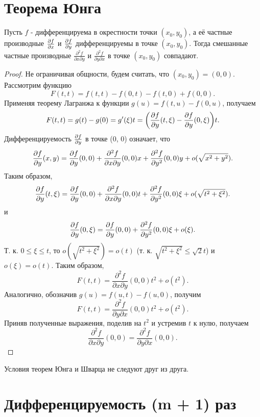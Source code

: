     \section{Теорема Юнга}
    
    \begin{theorem}[Юнг]
    	Пусть $f$ - дифференцируема в окрестности точки $(x_0, y_0)$, а её частные производные $\pdv{f}{x}$ и $\pdv{f}{y}$ дифференцируемы в точке $(x_0, y_0)$. Тогда смешанные частные производные $\frac{\partial^2 f}{\partial x \partial y}$ и $\frac{\partial^2 f}{\partial y \partial x}$ в точке $(x_0, y_0)$ совпадают.
    \end{theorem}
    
    \begin{proof}
    	Не ограничивая общности, будем считать, что $(x_0, y_0) = (0, 0)$. Рассмотрим функцию
    	\[ F(t, t) = f(t, t) - f(0, t) - f(t, 0) + f(0, 0). \]
    	Применяя теорему Лагранжа к функции $g(u) = f(t, u) - f(0, u)$, получаем
    	\[ F(t, t) = g(t) - g(0) = g'(\xi)t = \bigg(\frac{\partial f}{\partial y}(t, \xi) - \frac{\partial f}{\partial y}(0, \xi)\bigg)t. \]
    	Дифференцируемость $\frac{\partial f}{\partial y}$ в точке (0, 0) означает, что
    	\[ \frac{\partial f}{\partial y}(x, y) = \frac{\partial f}{\partial y}(0, 0) + \frac{\partial^2 f}{\partial x \partial y}(0, 0)x + \frac{\partial^2 f}{\partial y^2}(0, 0)y + o(\sqrt{x^2 + y^2}). \]
    	Таким образом,
    	\[ \frac{\partial f}{\partial y}(t, \xi) = \frac{\partial f}{\partial y}(0, 0) + \frac{\partial^2 f}{\partial x \partial y}(0, 0)t + \frac{\partial^2 f}{\partial y^2}(0, 0)\xi + o(\sqrt{t^2 + \xi^2}). \]
    	и
    	\[ \frac{\partial f}{\partial y}(0, \xi) = \frac{\partial f}{\partial y}(0, 0) + \frac{\partial^2 f}{\partial y^2}(0, 0)\xi + o(\xi). \]
    	Т. к. $0 \leqslant \xi \leqslant t$, то $o(\sqrt{t^2 + \xi^2}) = o(t)$ (т. к. $\sqrt{t^2 + \xi^2} \leqslant \sqrt{2}t$) и $o(\xi) = o(t)$. Таким образом,
    	\[ F(t, t) = \frac{\partial^2 f}{\partial x \partial y}(0, 0)t^2 + o(t^2). \]
    	Аналогично, обозначив $g(u) = f(u, t) - f(u, 0)$, получим
    	\[ F(t, t) = \frac{\partial^2 f}{\partial y \partial x}(0, 0)t^2 + o(t^2). \]
    	Приняв полученные выражения, поделив на $t^2$ и устремив $t$ к нулю, получаем
    	\[ \frac{\partial^2 f}{\partial x \partial y}(0, 0) = \frac{\partial^2 f}{\partial y \partial x}(0, 0). \]
    \end{proof}
    
    \begin{mention}
    	Условия теорем Юнга и Шварца не следуют друг из друга.
    \end{mention}
    
    \section{Дифференцируемость (m + 1) раз}
    
